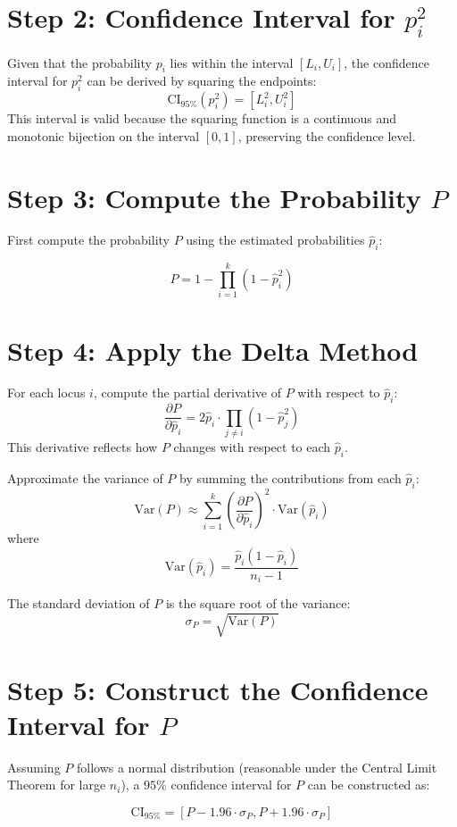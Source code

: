 \documentclass{article}
\begin{document}
\section*{Step 2: Confidence Interval for \( p_i^2 \)}

Given that the probability \( p_i \) lies within the interval \( \left[ L_i, U_i \right] \), the confidence interval for \( p_i^2 \) can be derived by squaring the endpoints:
\[
\text{CI}_{95\%}(p_i^2) = \left[ L_i^2, U_i^2 \right]
\]
This interval is valid because the squaring function is a continuous and monotonic bijection on the interval \( [0,1] \), preserving the confidence level.

\section*{Step 3: Compute the Probability \( P \)}

First compute the probability \( P \) using the estimated probabilities \( \hat{p}_i \):

\[
P = 1 - \prod_{i=1}^{k} (1 - \hat{p}_i^2)
\]

\section*{Step 4: Apply the Delta Method}

For each locus \( i \), compute the partial derivative of \( P \) with respect to \( \hat{p}_i \):
\[
\frac{\partial P}{\partial \hat{p}_i} = 2 \hat{p}_i \cdot \prod_{j \neq i} (1 - \hat{p}_j^2)
\]
This derivative reflects how \( P \) changes with respect to each \( \hat{p}_i \).

Approximate the variance of \( P \) by summing the contributions from each \( \hat{p}_i \):
\[
\text{Var}(P) \approx \sum_{i=1}^{k} \left(\frac{\partial P}{\partial \hat{p}_i}\right)^2 \cdot \text{Var}(\hat{p}_i)
\]
where
\[
\text{Var}(\hat{p}_i) = \frac{\hat{p}_i(1 - \hat{p}_i)}{n_i - 1}
\]

The standard deviation of \( P \) is the square root of the variance:
\[
\sigma_P = \sqrt{\text{Var}(P)}
\]

\section*{Step 5: Construct the Confidence Interval for \( P \)}

Assuming \( P \) follows a normal distribution (reasonable under the Central Limit \\
Theorem for large \( n_i \)), a \( 95\% \) confidence interval for \( P \) can be constructed as:

\[
\text{CI}_{95\%} = \left[ P - 1.96 \cdot \sigma_P, P + 1.96 \cdot \sigma_P \right]
\]
\end{document}
